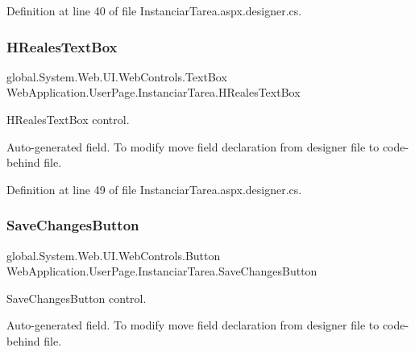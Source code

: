 Definition at line 40 of file Instanciar\+Tarea.\+aspx.\+designer.\+cs.

\mbox{\label{classWebApplication_1_1UserPage_1_1InstanciarTarea_a2e84cf99ac127f7b04854789af2b032e}} 
\subsubsection{\texorpdfstring{HRealesTextBox}{HRealesTextBox}}
{\footnotesize\ttfamily global.\+System.\+Web.\+U\+I.\+Web\+Controls.\+Text\+Box Web\+Application.\+User\+Page.\+Instanciar\+Tarea.\+H\+Reales\+Text\+Box\hspace{0.3cm}{\ttfamily [protected]}}



H\+Reales\+Text\+Box control. 

Auto-\/generated field. To modify move field declaration from designer file to code-\/behind file. 

Definition at line 49 of file Instanciar\+Tarea.\+aspx.\+designer.\+cs.

\mbox{\label{classWebApplication_1_1UserPage_1_1InstanciarTarea_a918404ca052ee1799aefc531a9e06d5a}} 
\subsubsection{\texorpdfstring{SaveChangesButton}{SaveChangesButton}}
{\footnotesize\ttfamily global.\+System.\+Web.\+U\+I.\+Web\+Controls.\+Button Web\+Application.\+User\+Page.\+Instanciar\+Tarea.\+Save\+Changes\+Button\hspace{0.3cm}{\ttfamily [protected]}}



Save\+Changes\+Button control. 

Auto-\/generated field. To modify move field declaration from designer file to code-\/behind file. 

